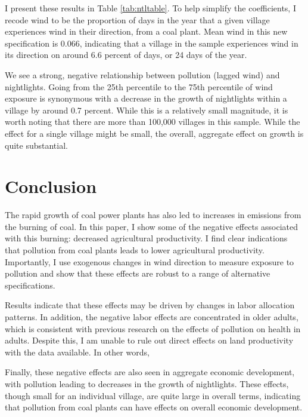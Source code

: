 \documentclass[
]{article}
\begin{document}
I present these results in Table \ref{tab:ntltable}. To help simplify the coefficients, I recode wind to be the proportion of days in the year that a given village experiences wind in their direction, from a coal plant. Mean wind in this new specification is 0.066, indicating that a village in the sample experiences wind in its direction on around 6.6 percent of days, or 24 days of the year.

We see a strong, negative relationship between pollution (lagged wind) and nightlights. Going from the 25th percentile to the 75th percentile of wind exposure is synonymous with a decrease in the growth of nightlights within a village by around 0.7 percent. While this is a relatively small magnitude, it is worth noting that there are more than 100,000 villages in this sample. While the effect for a single village might be small, the overall, aggregate effect on growth is quite substantial.

\hypertarget{conclusion}{%
\section{Conclusion}\label{conclusion}}

\label{conclusion}

The rapid growth of coal power plants has also led to increases in emissions from the burning of coal. In this paper, I show some of the negative effects associated with this burning: decreased agricultural productivity. I find clear indications that pollution from coal plants leads to lower agricultural productivity. Importantly, I use exogenous changes in wind direction to measure exposure to pollution and show that these effects are robust to a range of alternative specifications.

Results indicate that these effects may be driven by changes in labor allocation patterns. In addition, the negative labor effects are concentrated in older adults, which is consistent with previous research on the effects of pollution on health in adults. Despite this, I am unable to rule out direct effects on land productivity with the data available. In other words,

Finally, these negative effects are also seen in aggregate economic development, with pollution leading to decreases in the growth of nightlights. These effects, though small for an individual village, are quite large in overall terms, indicating that pollution from coal plants can have effects on overall economic development.
\end{document}
